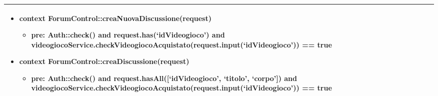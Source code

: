 \begin{tabular}{|| l | p{34em} ||}
\begin{itemize}[leftmargin=*]
	\item \textbf{context} ForumControl::creaNuovaDiscussione(request)
	\begin{itemize}
		\item[ ] \textbf{pre:} Auth::check()
		and request.has(‘idVideogioco’)
		and videogiocoService.checkVideogiocoAcquistato(request.input(‘idVideogioco’)) == true	
	\end{itemize}

	\item \textbf{context} ForumControl::creaDiscussione(request)
	\begin{itemize}
		\item[ ] \textbf{pre:} Auth::check()
		and request.hasAll([‘idVideogioco’, ‘titolo’, ‘corpo’])
		and videogiocoService.checkVideogiocoAcquistato(request.input(‘idVideogioco’)) == true	
	\end{itemize}

\end{itemize}\\
\hline
\end{tabular}

\newpage

